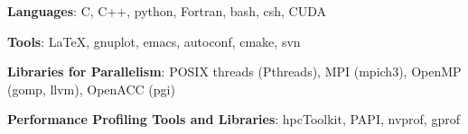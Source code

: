 {{\bf Languages}: C, C++, python, Fortran, bash, csh, CUDA}

{{\bf Tools}: LaTeX, gnuplot, emacs, autoconf, cmake, svn}

{{\bf Libraries for Parallelism}: POSIX threads (Pthreads), MPI (mpich3), OpenMP (gomp, llvm), OpenACC (pgi)}

{{\bf Performance Profiling Tools and Libraries}: hpcToolkit, PAPI, nvprof, gprof}

